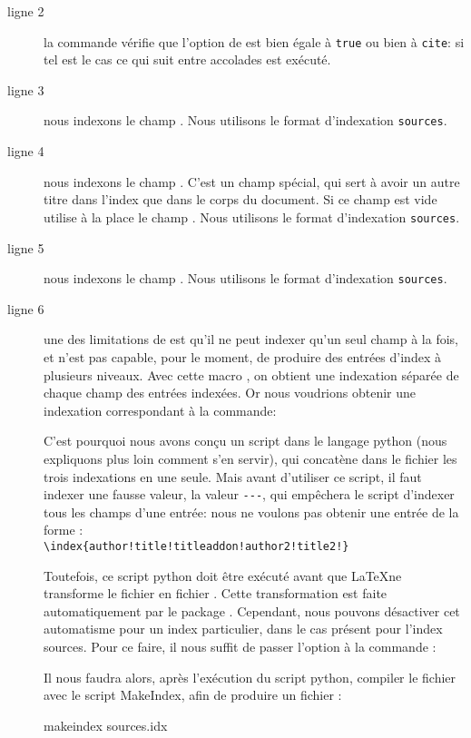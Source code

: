 \begin{description}
\item[ligne 2] la commande  vérifie que l'option  de  est bien égale à \verb|true| ou bien à \verb|cite|: si tel est le cas ce qui suit entre accolades est exécuté.
\item[ligne 3] nous indexons le champ .  Nous utilisons le format d'indexation \verb|sources|.
\item[ligne 4] nous indexons le champ . C'est un champ spécial, qui sert à avoir un autre titre dans l'index que dans le corps du document. Si ce champ est vide  utilise à la place le champ . Nous utilisons le format d'indexation \verb|sources|.
\item[ligne 5] nous indexons le champ . Nous utilisons le format d'indexation \verb|sources|.
\item[ligne 6]  une des limitations de  est qu'il ne peut indexer qu'un seul champ à la fois, et n'est pas capable, pour le moment, de produire des entrées d'index à plusieurs niveaux. 
Avec cette macro , on obtient une indexation séparée de chaque champ des entrées indexées. 
Or nous voudrions obtenir une indexation correspondant à la commande:
\begin{latexcode} 
\end{latexcode}
 C'est pourquoi nous avons conçu un script dans le langage python (nous expliquons plus loin comment s'en servir), qui concatène dans le fichier  les trois indexations en une seule.
Mais avant d'utiliser ce script, il faut  indexer une fausse valeur, la valeur \verb|---|, qui empêchera le script d'indexer tous les champs d'une entrée: nous ne voulons pas obtenir une entrée de la forme : \\
 \verb|\index{author!title!titleaddon!author2!title2!}|
 
Toutefois, ce script python doit être exécuté avant que \LaTeX ne transforme le fichier  en fichier . Cette transformation est faite automatiquement par le package . Cependant, nous pouvons désactiver cet automatisme pour un index particulier, dans le cas présent pour l'index sources. Pour ce faire, il nous suffit de passer l'option  à la commande  :\label{noautomatic}

\begin{latexcode}
\makeindex[name=sources,title=Index des sources,noautomatic]
\end{latexcode}

Il nous faudra alors, après l'exécution du script python, compiler le fichier  avec le script MakeIndex, afin de produire un fichier  :
\begin{bashcode}
makeindex sources.idx
\end{bashcode}
\end{description}

